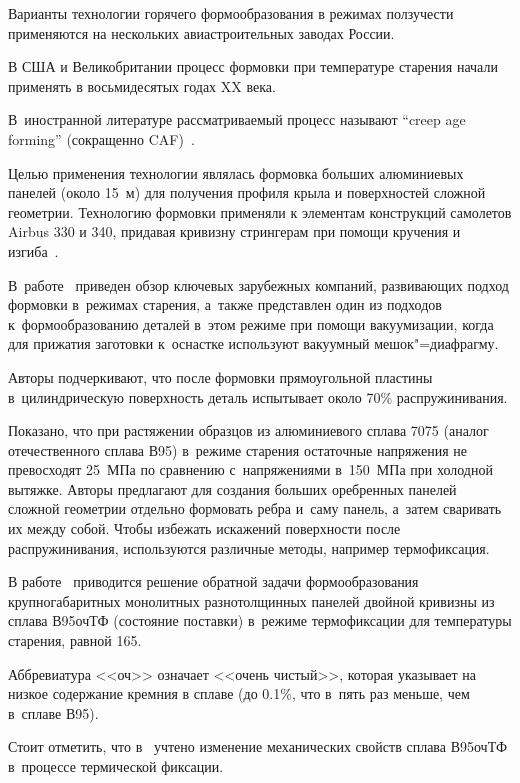 Варианты технологии горячего формообразования в режимах ползучести применяются на нескольких авиастроительных заводах России.



В США и Великобритании процесс формовки при температуре старения начали применять в восьмидесятых годах XX века. 

В~иностранной литературе рассматриваемый процесс называют ``creep age forming'' (сокращенно CAF)~\cite{iya:Ribeiro,iya:Beal, iya:add:1, iya:add:2, iya:add:3 }. 

Целью применения технологии являлась формовка больших алюминиевых панелей (около 15~м) для получения профиля крыла и поверхностей сложной геометрии. Технологию формовки применяли к элементам конструкций самолетов Airbus 330 и 340, придавая кривизну стрингерам при помощи кручения и изгиба~\cite{iya:Ribeiro}. 

В~работе~\cite{iya:Ribeiro} приведен обзор ключевых зарубежных компаний, развивающих подход формовки в~режимах старения, а~также представлен один из подходов к~формообразованию деталей в~этом режиме при помощи вакуумизации, когда для прижатия заготовки к~оснастке используют вакуумный мешок"=диафрагму. 

Авторы подчеркивают, что после формовки прямоугольной пластины в~цилиндрическую поверхность деталь испытывает около 70\% распружинивания. 

Показано, что при растяжении образцов из алюминиевого сплава 7075 (аналог отечественного сплава В95) в~режиме старения остаточные напряжения не превосходят 25~МПа по сравнению с~напряжениями в~150~МПа при холодной вытяжке. Авторы предлагают для создания больших оребренных панелей сложной геометрии отдельно формовать ребра и~саму панель, а~затем сваривать их между собой. Чтобы избежать искажений поверхности после распружинивания, используются различные методы, например термофиксация.



В работе~\cite{iya:Oleinikov} приводится решение обратной задачи формообразования крупногабаритных монолитных разнотолщинных панелей двойной кривизны из сплава В95очТФ (состояние поставки) в~режиме термофиксации для температуры старения, равной 165\textcelsius.  

Аббревиатура <<оч>> означает <<очень чистый>>, которая указывает на низкое содержание кремния в сплаве (до 0.1\%, что в~пять раз меньше, чем в~сплаве В95). 

Стоит отметить, что в~\cite{iya:Oleinikov} учтено изменение механических свойств сплава В95очТФ в~процессе термической фиксации. 

